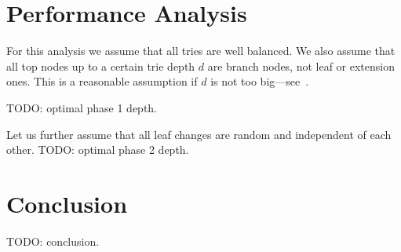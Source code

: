 \documentclass{amsart}
\begin{document}
\section{Performance Analysis}
For this analysis we assume that all tries are well balanced.
We also assume that all top nodes up to a certain trie depth $d$ are branch nodes, not leaf or extension ones.
This is a reasonable assumption if $d$ is not too big---see~\cite{akhunov_1x_workshop_part2}.

TODO: optimal phase 1 depth.

Let us further assume that all leaf changes are random and independent of each other.
TODO: optimal phase 2 depth.

\section{Conclusion}
TODO: conclusion.



\end{document}
